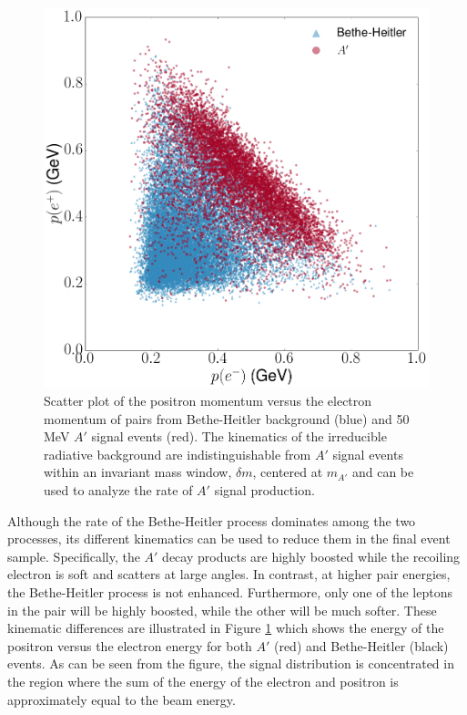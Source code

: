 \begin{figure}[ht]
    \centering
    \includegraphics[width=.8\textwidth]{images/bh_energy_cut.png}
    \caption{Scatter plot of the positron momentum versus the electron momentum 
             of pairs from Bethe-Heitler background (blue) and 50 MeV $A'$
             signal events (red). The kinematics of the irreducible radiative
         background are indistinguishable from $A'$ signal events within an 
         invariant mass window, $\delta m$, centered at $m_{A'}$ and can be 
        used to analyze the rate of $A'$ signal production.}
    \label{fig:ap_v_bethe}
\end{figure}
Although the rate of the Bethe-Heitler process dominates among the two 
processes, its different kinematics can be used to reduce them in the final 
event sample.  Specifically, the $A'$ decay products are highly boosted while 
the recoiling electron is soft and scatters at large angles.  In contrast, 
at higher pair energies, the Bethe-Heitler process is not enhanced.  Furthermore,
only one of the leptons in the pair will be highly boosted, while the other
will be much softer.  
These kinematic differences are illustrated in Figure \ref{fig:ap_v_bethe} which
shows the energy of the positron versus the electron energy for both $A'$ (red)
and Bethe-Heitler (black) events.  As can be seen from the figure, the signal
distribution is concentrated in the region where the sum of the energy of the
electron and positron is approximately equal to the beam energy.


